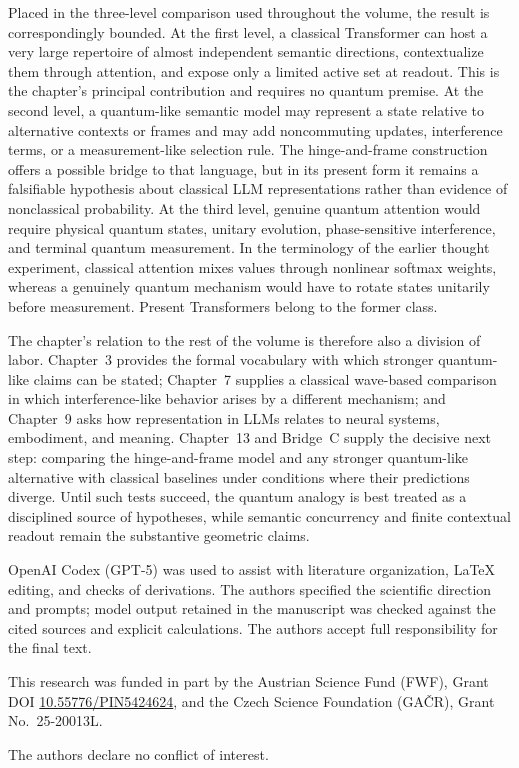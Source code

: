 \documentclass[
  aps,
  reprint,
  superscriptaddress,
  floatfix,
  nofootinbib,
  longbibliography
]{revtex4-2}
\begin{document}
Placed in the three-level comparison used throughout the volume, the result
is correspondingly bounded.  At the first level, a classical Transformer
can host a very large repertoire of almost independent semantic directions,
contextualize them through attention, and expose only a limited active set at
readout.  This is the chapter's principal contribution and requires no
quantum premise.  At the second level, a quantum-like semantic model may
represent a state relative to alternative contexts or frames and may add
noncommuting updates, interference terms, or a measurement-like selection
rule.  The hinge-and-frame construction offers a possible bridge to that
language, but in its present form it remains a falsifiable hypothesis about
classical LLM representations rather than evidence of nonclassical
probability.  At the third level, genuine quantum attention would require
physical quantum states, unitary evolution, phase-sensitive interference,
and terminal quantum measurement.  In the terminology of the earlier
thought experiment, classical attention mixes values through nonlinear
softmax weights, whereas a genuinely quantum mechanism would have to rotate
states unitarily before measurement.  Present Transformers belong to the
former class.

The chapter's relation to the rest of the volume is therefore also a division
of labor.  Chapter~3 provides the formal vocabulary with which stronger
quantum-like claims can be stated; Chapter~7 supplies a classical
wave-based comparison in which interference-like behavior arises by a
different mechanism; and Chapter~9 asks how representation in LLMs relates
to neural systems, embodiment, and meaning.  Chapter~13 and Bridge~C supply
the decisive next step: comparing the hinge-and-frame model and any stronger
quantum-like alternative with classical baselines under conditions where
their predictions diverge.  Until such tests succeed, the quantum analogy is
best treated as a disciplined source of hypotheses, while semantic
concurrency and finite contextual readout remain the substantive geometric
claims.

\begin{acknowledgments}
OpenAI Codex (GPT-5) was used to assist with literature organization, \LaTeX{}
editing, and checks of derivations.  The authors specified the scientific
direction and prompts; model output retained in the manuscript was checked
against the cited sources and explicit calculations.  The authors accept full
responsibility for the final text.

This research was funded in part by the Austrian
Science Fund (FWF), Grant DOI \href{https://doi.org/10.55776/PIN5424624}{10.55776/PIN5424624}, and the Czech Science
Foundation (GA\v{C}R), Grant No.~25-20013L.

The authors declare no conflict of interest.
\end{acknowledgments}


\end{document}
